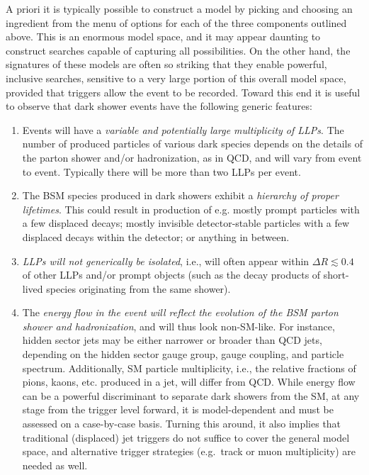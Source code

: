 A priori it is typically possible to construct a model by picking and choosing an ingredient from the menu of options for each of the three components outlined above. This is an enormous model space, and it may appear daunting to construct searches capable of capturing all possibilities. On the other hand, the signatures of these models are often so striking that they enable powerful, inclusive searches, sensitive to a very large portion of this overall model space, provided that triggers allow the event to be recorded. Toward this end it is useful to observe that dark shower events have the following generic features:
%
\begin {enumerate}

\item Events will have a {\it variable and potentially large multiplicity of LLPs}.
The number of produced particles of various dark species depends on the details of the parton shower and/or hadronization, as in QCD, and will vary from event to event. Typically there will be more than two LLPs per event.

\item The BSM species produced in dark showers exhibit a {\it hierarchy of proper lifetimes}.
This could result in production of e.g. mostly prompt particles with a few displaced decays; mostly invisible detector-stable particles with a few displaced decays within the detector; or anything in between.

\item {\it LLPs will not generically be isolated}, i.e., will often appear within $\Delta R \lesssim 0.4$ of other LLPs and/or prompt objects (such as the decay products of short-lived species originating from the same shower).

\item The {\it energy flow in the event will reflect the evolution of the BSM parton shower and hadronization}, and will thus look non-SM-like. For instance, hidden sector jets may be either narrower or broader than QCD jets, depending on the hidden sector gauge group, gauge coupling, and particle spectrum. Additionally, SM particle multiplicity, i.e., the relative fractions of pions, kaons, etc. produced in a jet, will differ from QCD. While energy flow can be a powerful discriminant to separate dark showers from the SM, at any stage from the trigger level forward, it is model-dependent and must be assessed on a case-by-case basis. Turning this around, it also implies that traditional (displaced) jet triggers do not suffice to cover the general model space, and alternative trigger strategies (e.g.~track or muon multiplicity) are needed as well.

\end {enumerate}

